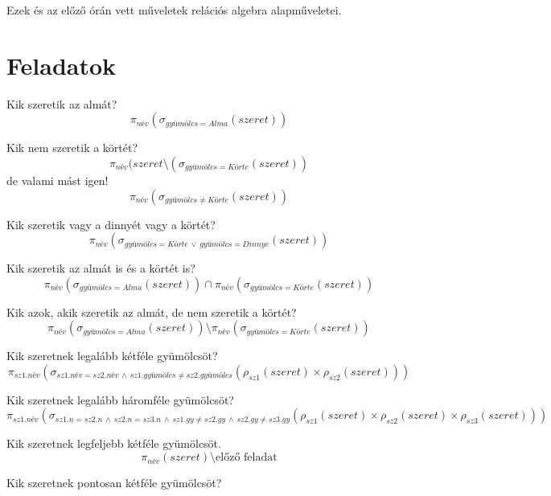 \documentclass[a4paper,12pt]{article}
\theoremstyle{definition}
\begin{document}
Ezek és az előző órán vett műveletek relációs algebra alapműveletei.

\section{Feladatok}
\begin{question}
	Kik szeretik az almát?
	\[
	\pi_{név}(\sigma_{gyümölcs = Alma}(szeret))
	\]
\end{question}
\begin{question}
	Kik nem szeretik a körtét?
	\[
	\pi_{név}(szeret \setminus (\sigma_{gyümölcs = Körte}(szeret))
	\]
	de valami mást igen!
	\[
		\pi_{név}(\sigma_{gyümölcs \ne Körte}(szeret))
	\]
\end{question}

\begin{question}
	Kik szeretik vagy a dinnyét vagy a körtét?
	\[
	\pi_{név}(\sigma_{gyümölcs = Körte \, \lor \, gyümölcs = Dinnye}(szeret))
	\]
\end{question}

\begin{question}
	Kik szeretik az almát is és a körtét is?
	\[
	\pi_{név}(\sigma_{gyümölcs = Alma}(szeret)) \cap \pi_{név}(\sigma_{gyümölcs = Körte}(szeret))
	\]
\end{question}

\begin{question}
	Kik azok, akik szeretik az almát, de nem szeretik a körtét?
	\[
	\pi_{név}(\sigma_{gyümölcs = Alma}(szeret)) \setminus \pi_{név}(\sigma_{gyümölcs = Körte}(szeret))
	\]
\end{question}

\begin{question}
	Kik szeretnek legalább kétféle gyümölcsöt?
	\[
	\pi_{sz1.név}\left(\sigma_{sz1.név = sz2.név \, \land \, sz1.gyümölcs \ne sz2.gyümölcs}{\left(\rho_{sz1}\left(szeret\right) \times \rho_{sz2}\left(szeret\right)\right)}\right)
	\]
\end{question}

\begin{question}
	Kik szeretnek legalább háromféle gyümölcsöt?
	\[
	\pi_{sz1.név}\left(\sigma_{sz1.n = sz2.n \, \land \, sz2.n = sz3.n \, \land \, sz1.gy \ne sz2.gy \, \land \, sz2.gy \ne sz3.gy}{\left(\rho_{sz1}\left(szeret\right) \times \rho_{sz2}\left(szeret\right) \times \rho_{sz3}\left(szeret\right)\right)}\right)
	\]
\end{question}

\begin{question}
	Kik szeretnek legfeljebb kétféle gyümölcsöt.
	\[
	\pi_{név}\left(szeret \right) \setminus {\text{előző feladat}}
	\]
\end{question}

\begin{question}
	Kik szeretnek pontosan kétféle gyümölcsöt?
	\[
	\
	\]
\end{question}
\end{document}
